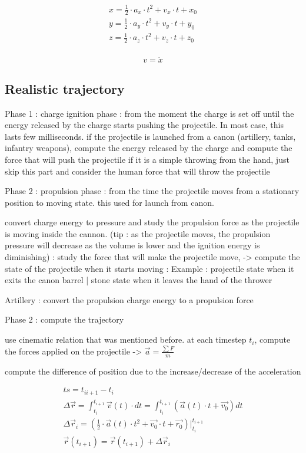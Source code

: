\documentclass[12pt,a4paper]{article}
\begin{document}
\begin{eqnarray}
	x = \frac{1}{2} \cdot a_x \cdot t^2 + v_x \cdot t + x_0 \\
	y = \frac{1}{2} \cdot a_y \cdot t^2 + v_y \cdot t + y_0 \\
	z = \frac{1}{2} \cdot a_z \cdot t^2 + v_z \cdot t + z_0 \\
\end{eqnarray}

\begin{equation}
	v = \dot{x}
\end{equation}


\subsection{Realistic trajectory}

Phase 1 : charge ignition phase : from the moment the charge is set off until the energy released by the charge starts pushing the projectile. In most case, this lasts few milliseconds.
if the projectile is launched from a canon (artillery, tanks, infantry weapons), compute the energy released by the charge and compute the force that will push the projectile
if it is a simple throwing from the hand, just skip this part and consider the human force that will throw the projectile

Phase 2 : propulsion phase : from the time the projectile moves from a stationary position to moving state. this used for launch from canon. 

convert charge energy to pressure and study the propulsion force as the projectile is moving inside the cannon. 
(tip : as the projectile moves, the propulsion pressure will decrease as the volume is lower and the ignition energy is diminishing)
: study the force that will make the projectile move, -> compute the state of the projectile when it starts moving :
Example : projectile state when it exits the canon barrel | stone state when it leaves the hand of the thrower

Artillery : convert the propulsion charge energy to a propulsion force

Phase 2 : compute the trajectory

use cinematic relation that was mentioned before. 
at each timestep $t_i$, compute the forces applied on the projectile -> $\vec{a} = \frac{ \sum F}{m}$

compute the difference of position due to the increase/decrease of the acceleration

\begin{eqnarray}
	ts = t_{ii+1} - t_i\\
	\Delta \vec{r} = \int_{t_i}^{t_{i+1}}  \vec{v}(t) \cdot dt = \int_{t_i}^{t_{i+1}}  (\vec{a}(t) \cdot t + \vec{v_0}) dt\\
	\Delta \vec{r}_i = (\frac{1}{2} \cdot \vec{a}(t) \cdot t^2 + \vec{v_0} \cdot t + \vec{r_0}) \bigg|_{t_i}^{t_{i+1}}\\
	\vec{r}(t_{i+1}) = \vec{r}(t_{i+1}) + \Delta \vec{r}_i
\end{eqnarray}
\end{document}
